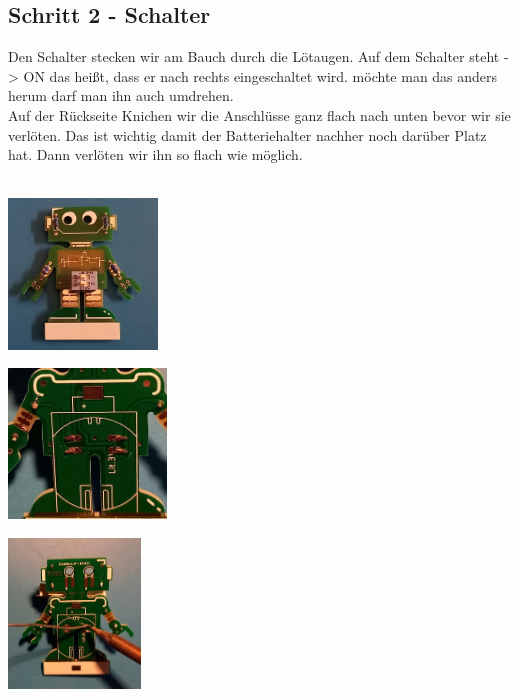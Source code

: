 \documentclass[a4paper]{article}
\begin{document}
\subsection{Schritt 2 - Schalter}
Den Schalter stecken wir am Bauch durch die Lötaugen. Auf dem Schalter steht -> ON das heißt, dass er nach rechts eingeschaltet wird. möchte man das anders herum darf man ihn auch umdrehen.\\
Auf der Rückseite Knichen wir die Anschlüsse ganz flach nach unten bevor wir sie verlöten. Das ist wichtig damit der Batteriehalter nachher noch darüber Platz hat. Dann verlöten wir ihn so flach wie möglich.\\ \ \\
\begin{minipage}[t]{0.33\textwidth}
  \centering
  \includegraphics[height=4cm]{../pictures/Switch1.jpg}
  \label{img:Resistor1}
  \end{minipage}
\begin{minipage}[t]{0.33\textwidth}
  \centering
  \includegraphics[height=4cm]{../pictures/Switch2.jpg}
  \label{img:Switch2}
\end{minipage}
\begin{minipage}[t]{0.33\textwidth}
  \centering
  \includegraphics[height=4cm]{../pictures/Switch3.jpg}
  \label{img:Switch3}
\end{minipage}
\end{document}
